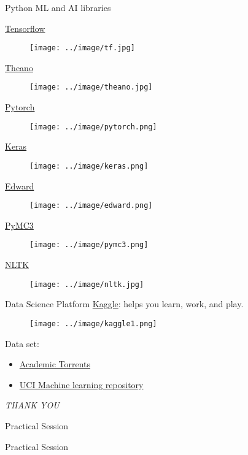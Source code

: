 \documentclass{bredelebeamer}
\begin{document}
\begin{frame}{Python ML and AI libraries}
\begin{multicols}{4}
\href{https://www.tensorflow.org/}{Tensorflow}
\begin{figure}[h]
\texttt{[image: ../image/tf.jpg]}
\end{figure} 
\href{http://deeplearning.net/software/theano/}{Theano}
\begin{figure}[h]
\texttt{[image: ../image/theano.jpg]}
\end{figure}
\href{http://pytorch.org/}{Pytorch}
\begin{figure}[h]
\texttt{[image: ../image/pytorch.png]}
\end{figure}
\href{https://keras.io/}{Keras}
\begin{figure}[h]
\texttt{[image: ../image/keras.png]}
\end{figure}
\href{http://edwardlib.org/}{Edward}
\begin{figure}[h]
\texttt{[image: ../image/edward.png]}
\end{figure}
\href{http://pymc-devs.github.io/pymc3/}{PyMC3}
\begin{figure}[h]
\texttt{[image: ../image/pymc3.png]}
\end{figure}
\href{http://www.nltk.org/}{NLTK}
\begin{figure}[h]
\texttt{[image: ../image/nltk.jpg]}
\end{figure}
\end{multicols}
\end{frame}


\begin{frame}{Data Science Platform}
\href{https://www.kaggle.com/}{Kaggle}: helps you learn, work, and play.
\begin{figure}[h]
		\texttt{[image: ../image/kaggle1.png]}
\end{figure}
Data set:
\begin{itemize}
	\item \href{http://academictorrents.com/}{Academic Torrents}
	\item \href{https://archive.ics.uci.edu/ml/datasets.html}{UCI Machine learning repository}
\end{itemize}	
\end{frame}
\begin{frame}
\centering
\emph{THANK YOU}
\end{frame}

\begin{frame}{Practical Session}

\centering
{\LARGE
    Practical Session 
}
\end{frame}
\end{document}
